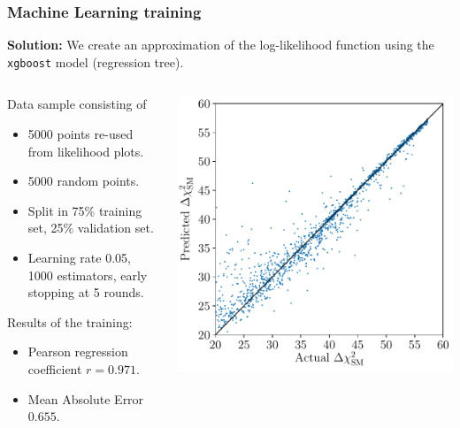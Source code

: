 \documentclass[mathserif, 10pt, dvipsnames]{beamer}
\begin{document}
\begin{frame}
\begin{columns}[onlytextwidth]
\begin{column}{0.25\textwidth}
    \end{column}
\end{columns}
\end{frame}

\begin{frame}\frametitle{Machine Learning training}

    \textbf{Solution:} We create an approximation of the log-likelihood function using the \texttt{xgboost} model (regression tree).

    \begin{columns}
        \begin{column}{0.5\textwidth}
            Data sample consisting of
            \begin{itemize}
                \item 5000 points re-used from likelihood plots.
                \item 5000 random points.
                \item Split in 75\% training set, 25\% validation set.
                \item Learning rate 0.05, 1000 estimators, early stopping at 5 rounds.
            \end{itemize}
            Results of the training:
            \begin{itemize}
                \item Pearson regression coefficient $r=0.971$.
                \item Mean Absolute Error $0.655$.
            \end{itemize}
        \end{column}
        \begin{column}{0.5\textwidth}
            \includegraphics[width=\columnwidth]{figures/regression_xgb.pdf}
        \end{column}
    \end{columns}

\end{frame}
\end{document}
